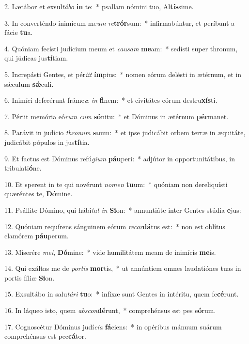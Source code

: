 2. Lætábor et exsul\textit{tá}\textit{bo} \textbf{in} te:~*  psallam nómini tuo, Al\textbf{tís}sime.\

3. In converténdo inimícum me\textit{um} \textit{re}\textbf{trór}sum:~*  infirmabúntur, et períbunt a fácie \textbf{tu}a.\

4. Quóniam fecísti judícium meum et \textit{cau}\textit{sam} \textbf{me}am:~*  sedísti super thronum, qui júdicas jus\textbf{tí}tiam.\

5. Increpásti Gentes, et pér\textit{i}\textit{it} \textbf{ím}pius:~*  nomen eórum delésti in ætérnum, et in sǽculum \textbf{sǽ}culi.\

6. Inimíci defecérunt fráme\textit{æ} \textit{in} \textbf{fi}nem:~*  et civitátes eórum destru\textbf{xís}ti.\

7. Périit memória eó\textit{rum} \textit{cum} \textbf{só}nitu:~*  et Dóminus in ætérnum \textbf{pér}manet.\

8. Parávit in judício \textit{thro}\textit{num} \textbf{su}um:~*  et ipse judicábit orbem terræ in æquitáte, judicábit pópulos in jus\textbf{tí}tia.\

9. Et factus est Dóminus refú\textit{gi}\textit{um} \textbf{páu}peri:~*  adjútor in opportunitátibus, in tribulati\textbf{ó}ne.\

10. Et sperent in te qui novérunt \textit{no}\textit{men} \textbf{tu}um:~*  quóniam non dereliquísti quæréntes te, \textbf{Dó}mine.\

11. Psállite Dómino, qui hábi\textit{tat} \textit{in} \textbf{Si}on:~*  annuntiáte inter Gentes stúdia \textbf{e}jus:\

12. Quóniam requírens sánguinem eórum \textit{re}\textit{cor}\textbf{dá}tus est:~*  non est oblítus clamórem \textbf{páu}perum.\

13. Miserére \textit{me}\textit{i}, \textbf{Dó}mine:~*  vide humilitátem meam de inimícis \textbf{me}is.\

14. Qui exáltas me de \textit{por}\textit{tis} \textbf{mor}tis,~*  ut annúntiem omnes laudatiónes tuas in portis fíliæ \textbf{Si}on.\

15. Exsultábo in salu\textit{tá}\textit{ri} \textbf{tu}o:~*  infíxæ sunt Gentes in intéritu, quem fe\textbf{cé}runt.\

16. In láqueo isto, quem \textit{abs}\textit{con}\textbf{dé}runt,~*  comprehénsus est pes e\textbf{ó}rum.\

17. Cognoscétur Dóminus judí\textit{ci}\textit{a} \textbf{fá}ciens:~*  in opéribus mánuum suárum comprehénsus est pec\textbf{cá}tor.\

